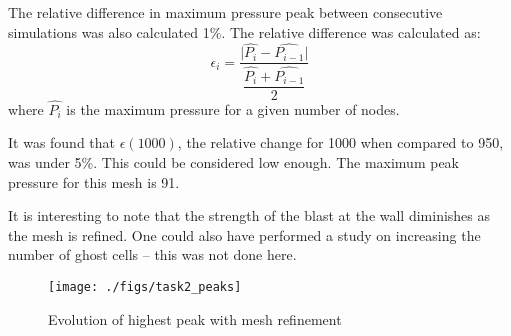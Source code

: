 The relative difference in maximum pressure peak between consecutive simulations was also calculated 1\%. The relative difference was calculated as:
\begin{equation}
    \epsilon_i = \dfrac{\big| \hat{P_i} - \hat{P_{i-1}} \big|}{\dfrac{\hat{P_i} + \hat{P_{i-1}}}{2}}
\end{equation}
where $\hat{P_i}$ is the maximum pressure for a given number of nodes.

It was found that $\epsilon(1000)$, the relative change for 1000 when compared to 950, was under 5\%. This could be considered low enough. The maximum peak pressure for this mesh is 91.

It is interesting to note that the strength of the blast at the wall diminishes as the mesh is refined. One could also have performed a study on increasing the number of ghost cells -- this was not done here.
%
\begin{figure}
    \centering
    \texttt{[image: ./figs/task2\_peaks]}
    \caption{Evolution of highest peak with mesh refinement}\label{fig:task2_peaks}
\end{figure}
%

